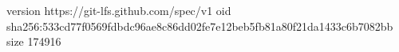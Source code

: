 version https://git-lfs.github.com/spec/v1
oid sha256:533cd77f0569fdbdc96ae8c86dd02fe7e12beb5fb81a80f21da1433c6b7082bb
size 174916
